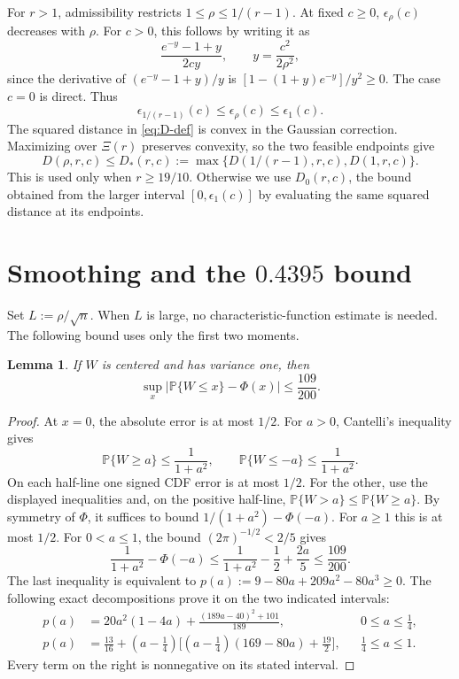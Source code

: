 \documentclass[11pt]{article}
\newtheorem{lemma}[theorem]{Lemma}
\newcommand{\Pp}{\mathbb P}
\begin{document}
For \(r>1\), admissibility restricts \(1\le\rho\le1/(r-1)\).
At fixed \(c\ge0\), \(\epsilon_\rho(c)\) decreases with \(\rho\).
For \(c>0\), this follows by writing it as
\[
 \frac{e^{-y}-1+y}{2cy},\qquad y=\frac{c^2}{2\rho^2},
\]
since the derivative of \((e^{-y}-1+y)/y\) is
\([1-(1+y)e^{-y}]/y^2\ge0\). The case \(c=0\) is direct. Thus
\[
 \epsilon_{1/(r-1)}(c)\le\epsilon_\rho(c)\le\epsilon_1(c).
\]
The squared distance in \eqref{eq:D-def} is convex in the Gaussian correction.
Maximizing over \(\Xi(r)\) preserves convexity, so the two feasible
endpoints give
\[
 D(\rho,r,c)\le D_*(r,c):=
 \max\{D(1/(r-1),r,c),D(1,r,c)\}.
 \label{eq:Dstar}\tag{3.8}
\]
This is used only when \(r\ge19/10\). Otherwise we use
\(D_0(r,c)\), the bound obtained from the larger interval
\([0,\epsilon_1(c)]\) by evaluating the same squared distance at its endpoints.

\section{Smoothing and the \texorpdfstring{\(0.4395\)}{0.4395} bound}\label{sec:prawitz}

Set \(L:=\rho/\sqrt n\). When \(L\) is large, no characteristic-function
estimate is needed. The following bound uses only the first two moments.

\begin{lemma}\label{lem:universal}
If \(W\) is centered and has variance one, then
\[
 \sup_x|\Pp\{W\le x\}-\Phi(x)|\le\frac{109}{200}.
\]
\end{lemma}

\begin{proof}
At \(x=0\), the absolute error is at most \(1/2\). For \(a>0\),
Cantelli's inequality gives
\[
 \Pp\{W\ge a\}\le\frac1{1+a^2},\qquad
 \Pp\{W\le-a\}\le\frac1{1+a^2}.
\]
On each half-line one signed CDF error is at most \(1/2\). For the
other, use the displayed inequalities and, on the positive half-line,
\(\Pp\{W>a\}\le\Pp\{W\ge a\}\). By symmetry of \(\Phi\), it suffices
to bound \(1/(1+a^2)-\Phi(-a)\). For \(a\ge1\) this is at most \(1/2\).
For \(0<a\le1\), the bound \((2\pi)^{-1/2}<2/5\) gives
\[
 \frac1{1+a^2}-\Phi(-a)
 \le\frac1{1+a^2}-\frac12+\frac{2a}{5}\le\frac{109}{200}.
\]
The last inequality is equivalent to \(p(a):=9-80a+209a^2-80a^3\ge0\).
The following exact decompositions prove it on the two indicated intervals:
\[
\begin{aligned}
p(a)&=20a^2(1-4a)+\frac{(189a-40)^2+101}{189},
       &&0\le a\le\tfrac14,\\
p(a)&=\frac{13}{16}+(a-\tfrac14)
       \bigl[(a-\tfrac14)(169-80a)+\tfrac{19}{2}\bigr],
       &&\tfrac14\le a\le1.
\end{aligned}
\]
Every term on the right is nonnegative on its stated interval.
\end{proof}
\end{document}
